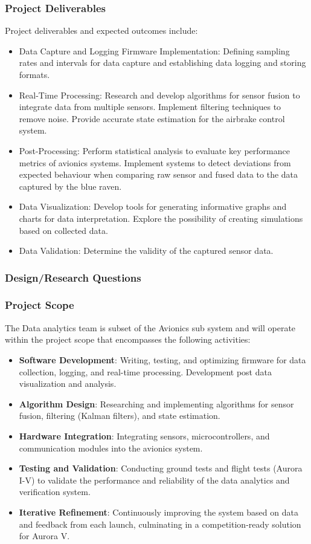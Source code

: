 \subsubsection{Project Deliverables}
Project deliverables and expected outcomes include:  
\begin{itemize}
  \item Data Capture and Logging Firmware Implementation: Defining sampling rates and intervals for data capture and establishing data logging and storing formats. 
  \item Real-Time Processing: Research and develop algorithms for sensor fusion to integrate data from multiple sensors. Implement filtering techniques to remove noise. Provide accurate state estimation for the airbrake control system. 
  \item Post-Processing: Perform statistical analysis to evaluate key performance metrics of avionics systems. Implement systems to detect deviations from expected behaviour when comparing raw sensor and fused data to the data captured by the blue raven. 
  \item Data Visualization: Develop tools for generating informative graphs and charts for data interpretation. Explore the possibility of creating simulations based on collected data. 
  \item Data Validation: Determine the validity of the captured sensor data.  
\end{itemize}

\subsubsection{Design/Research Questions}
\subsubsection{Project Scope}
The Data analytics team is subset of the Avionics sub system and will operate within the project scope that encompasses the following activities: 
\begin{itemize}
  \item \textbf{Software Development}: Writing, testing, and optimizing firmware for data collection, logging, and real-time processing. Development post data visualization and analysis. 
  \item \textbf{Algorithm Design}: Researching and implementing algorithms for sensor fusion, filtering (Kalman filters), and state estimation. 
  \item \textbf{Hardware Integration}: Integrating sensors, microcontrollers, and communication modules into the avionics system. 
  \item \textbf{Testing and Validation}: Conducting ground tests and flight tests (Aurora I-V) to validate the performance and reliability of the data analytics and verification system. 
  \item \textbf{Iterative Refinement}: Continuously improving the system based on data and feedback from each launch, culminating in a competition-ready solution for Aurora V.
\end{itemize}

